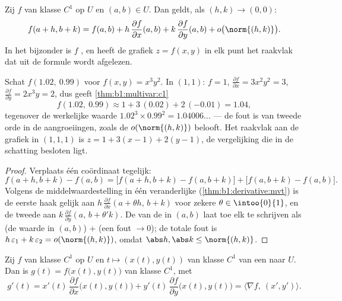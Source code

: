 \begin{theorem}\label{thm:b1:multivar:c1}
Zij $f$ van klasse $C^1$ op $U$ en $(a,b) \in U$. Dan geldt, als
$(h, k) \to (0,0)$:
\[
f(a + h, b + k) = f(a, b)
+ h\,\frac{\partial f}{\partial x}(a,b)
+ k\,\frac{\partial f}{\partial y}(a,b)
+ o\bigl(\norm{(h,k)}\bigr) .
\]
In het bijzonder is $f$ , en heeft de grafiek $z = f(x,y)$ in
elk punt het raakvlak dat uit de formule wordt afgelezen.
\end{theorem}

\begin{example}
\label{ex:b1:multivar:linapprox}
Schat $f(1.02,\ 0.99)$ voor $f(x, y) = x^3y^2$. In $(1, 1)$: $f =
1$, $\frac{\partial f}{\partial x} = 3x^2y^2 = 3$, $\frac{\partial
f}{\partial y} = 2x^3y = 2$, dus geeft
\cref{thm:b1:multivar:c1}
\[
f(1.02,\ 0.99) \approx 1 + 3\,(0.02) + 2\,(-0.01) = 1.04 ,
\]
tegenover de werkelijke waarde $1.02^3 \times 0.99^2 =
1.04006\dots$ --- de fout is van tweede orde in de aangroeiingen,
zoals de $o(\norm{(h,k)})$ belooft. Het raakvlak aan de grafiek in
$(1, 1, 1)$ is $z = 1 + 3(x - 1) + 2(y - 1)$, de vergelijking die
in de schatting besloten ligt.
\end{example}

\begin{proof}
Verplaats één coördinaat tegelijk:
\[
f(a+h, b+k) - f(a,b)
= \bigl[f(a+h, b+k) - f(a, b+k)\bigr] + \bigl[f(a, b+k) -
f(a,b)\bigr].
\]
Volgens de middelwaardestelling in één veranderlijke
(\cref{thm:b1:derivative:mvt}) is de eerste haak gelijk aan $h\,
\frac{\partial f}{\partial x}(a + \theta h,\, b + k)$ voor zekere
$\theta \in \intoo{0}{1}$, en de tweede aan $k\,\frac{\partial
f}{\partial y}(a,\, b + \theta' k)$. De  van de
 in $(a,b)$ laat toe elk te schrijven als (de
waarde in $(a,b)$) $+$ (een fout $\to 0$); de totale fout is
$h\,\varepsilon_1 + k\,\varepsilon_2 = o(\norm{(h,k)})$, omdat
$\abs h, \abs k \leq \norm{(h,k)}$.
\end{proof}

\begin{theorem}[Kettingregel]\label{thm:b1:multivar:chain}
Zij $f$ van klasse $C^1$ op $U$ en $t \mapsto (x(t), y(t))$ van
klasse $C^1$ van een  naar $U$. Dan is $g(t) =
f\bigl(x(t), y(t)\bigr)$ van klasse $C^1$, met
\[
g'(t) = x'(t)\,\frac{\partial f}{\partial x}\bigl(x(t),y(t)\bigr)
+ y'(t)\,\frac{\partial f}{\partial y}\bigl(x(t),y(t)\bigr)
= \bigl\langle \nabla f,\ (x', y')\bigr\rangle .
\]
\end{theorem}

